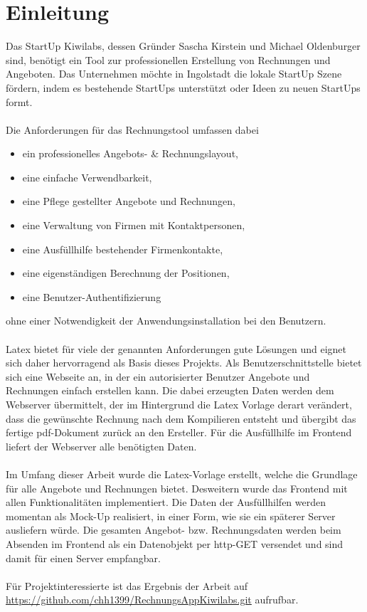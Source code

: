 \chapter{Einleitung}
\label{cha:Einleitung}

Das StartUp Kiwilabs, dessen Gründer Sascha Kirstein und Michael Oldenburger sind, benötigt ein Tool zur professionellen Erstellung von Rechnungen und Angeboten. Das Unternehmen möchte in Ingolstadt die lokale StartUp Szene fördern, indem es bestehende StartUps unterstützt oder Ideen zu neuen StartUps formt.
\\ \\
Die Anforderungen für das Rechnungstool umfassen dabei
\begin{itemize}
\item ein professionelles Angebots- \& Rechnungslayout,
\item eine einfache Verwendbarkeit,
\item eine Pflege gestellter Angebote und Rechnungen,
\item eine Verwaltung von Firmen mit Kontaktpersonen,
\item eine Ausfüllhilfe bestehender Firmenkontakte,
\item eine eigenständigen Berechnung der Positionen,
\item eine Benutzer-Authentifizierung
\end{itemize}
ohne einer Notwendigkeit der Anwendungsinstallation bei den Benutzern.
\\ \\
Latex bietet für viele der genannten Anforderungen gute Lösungen und eignet sich daher hervorragend als Basis dieses Projekts. Als Benutzerschnittstelle bietet sich eine Webseite an, in der ein autorisierter Benutzer Angebote und Rechnungen einfach erstellen kann. Die dabei erzeugten Daten werden dem Webserver übermittelt, der im Hintergrund die Latex Vorlage derart verändert, dass die gewünschte Rechnung nach dem Kompilieren entsteht und übergibt das fertige \ac{pdf}-Dokument zurück an den Ersteller. Für die Ausfüllhilfe im Frontend liefert der Webserver alle benötigten Daten.
\\ \\
Im Umfang dieser Arbeit wurde die Latex-Vorlage erstellt, welche die Grundlage für alle Angebote und Rechnungen bietet. Desweitern wurde das Frontend mit allen Funktionalitäten implementiert. Die Daten der Ausfüllhilfen werden momentan als Mock-Up realisiert, in einer Form, wie sie ein späterer Server ausliefern würde. Die gesamten Angebot- bzw. Rechnungsdaten werden beim Absenden im Frontend als ein Datenobjekt per \ac{http}-GET versendet und sind damit für einen Server empfangbar. 
\\ \\
Für Projektinteressierte ist das Ergebnis der Arbeit auf \url{https://github.com/chh1399/RechnungsAppKiwilabs.git} aufrufbar.
